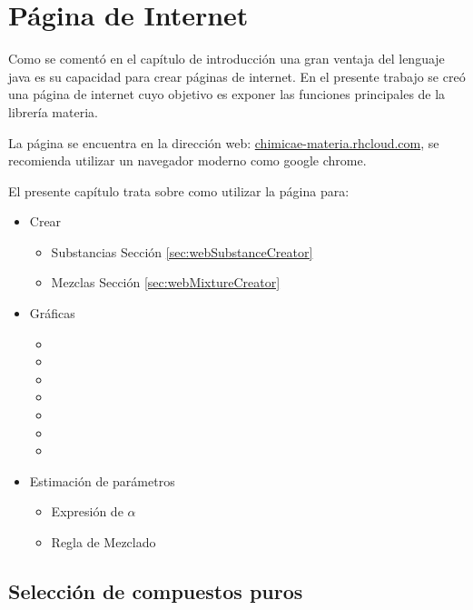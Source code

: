 \chapter{Página de Internet}\label{chap:webpage}

	Como se comentó en el capítulo de introducción una gran ventaja del lenguaje java es su capacidad para crear páginas de internet. En el presente trabajo se creó una página de internet cuyo objetivo es exponer las funciones principales de la librería materia.

	La página se encuentra en la dirección web: \url{chimicae-materia.rhcloud.com}, se recomienda utilizar un navegador moderno como google chrome.

	El presente capítulo trata sobre como utilizar la página para:

	\begin{itemize}
		\item{Crear}
			\begin{itemize}
				\item{Substancias} Sección \ref{sec:webSubstanceCreator}
				\item{Mezclas} Sección \ref{sec:webMixtureCreator}
			\end{itemize}
		\item{Gráficas}
			\begin{itemize}
				\item {}
				\item {}
				\item {}
				\item {}
				\item {}
				\item {}
				\item {}
			\end{itemize}
		\item{Estimación de parámetros}
			\begin{itemize}
				\item Expresión de $\alpha$
				\item Regla de Mezclado
			\end{itemize}
	\end{itemize}

\section{Selección de compuestos puros}\label{sec:webCompounds}

